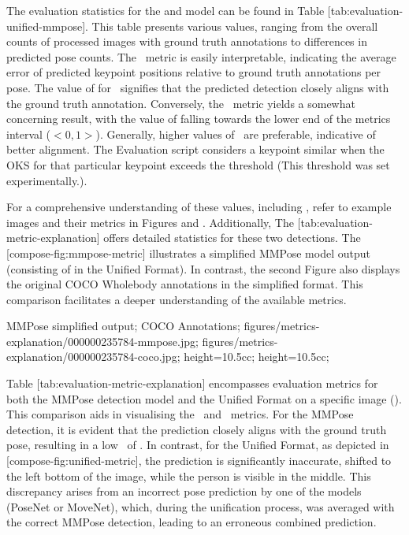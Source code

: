 The evaluation statistics for the  and  model can be found in Table [tab:evaluation-unified-mmpose]. This table presents various values, ranging from the overall counts of processed images with ground truth annotations to differences in predicted pose counts. The \APE\ metric is easily interpretable, indicating the average error of predicted keypoint positions relative to ground truth annotations per pose. The value of  for \APE\ signifies that the predicted detection closely aligns with the ground truth annotation. Conversely, the \OKS\ metric yields a somewhat concerning result, with the value of  falling towards the lower end of the metrics interval ($ <0,1> $). Generally, higher values of \OKS\ are preferable, indicative of better alignment. The Evaluation script considers a keypoint similar when the OKS for that particular keypoint exceeds the  threshold (This threshold was set experimentally.).

For a comprehensive understanding of these values, including \MSE, refer to example images and their metrics in Figures  and . Additionally, The [tab:evaluation-metric-explanation] offers detailed statistics for these two detections. The [compose-fig:mmpose-metric] illustrates a simplified MMPose model output (consisting of  in the Unified Format). In contrast, the second Figure also displays the original COCO Wholebody annotations in the simplified format. This comparison facilitates a deeper understanding of the available metrics.

 {
 MMPose simplified output;
 COCO Annotations;
 }
 {
 figures/metrics-explanation/000000235784-mmpose.jpg;
 figures/metrics-explanation/000000235784-coco.jpg;
 }
 {
 height=10.5cc;
 height=10.5cc;
 }


Table [tab:evaluation-metric-explanation] encompasses evaluation metrics for both the MMPose detection model and the Unified Format on a specific image (). This comparison aids in visualising the \APE\ and \MSE\ metrics. For the MMPose detection, it is evident that the prediction closely aligns with the ground truth pose, resulting in a low \APE\ of . In contrast, for the Unified Format, as depicted in [compose-fig:unified-metric], the prediction is significantly inaccurate, shifted to the left bottom of the image, while the person is visible in the middle. This discrepancy arises from an incorrect pose prediction by one of the models (PoseNet or MoveNet), which, during the unification process, was averaged with the correct MMPose detection, leading to an erroneous combined prediction.

